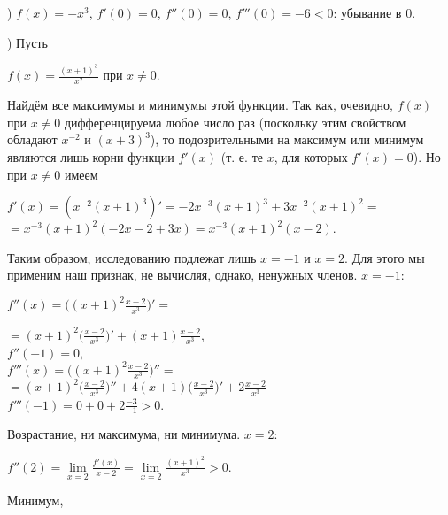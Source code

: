 \footnotesize
{}
\linespread{1}
\normalsize
{}) $f(x)=-x^3$, $f'(0)=0$, $f''(0)=0$, $f'''(0)=-6<0$: убывание в 0.
\par{}) Пусть
\begin{center}
$f(x)=\frac{(x+1)^3}{x^2}$ при $x\neq0$.
\end{center}
Найдём все максимумы и минимумы этой функции. Так как, очевидно, $f(x)$ при $x\neq0$ дифференцируема любое число раз (поскольку этим свойством обладают $x^{-2}$ и $(x+3)^3$), то подозрительными на максимум или минимум являются лишь корни функции $f'(x)$ (т. е. те $x$, для которых $f'(x)=0$). Но при $x\neq0$ имеем
\begin{center}
$f'(x)=(x^{-2}(x+1)^3)'=-2x^{-3}(x+1)^3+3x^{-2}(x+1)^2=$\\
$=x^{-3}(x+1)^2(-2x-2+3x)=x^{-3}(x+1)^2(x-2)$.
\end{center}
Таким образом, исследованию подлежат лишь $x=-1$ и $x=2$. Для этого мы применим наш признак, не вычисляя, однако, ненужных членов.
 $x=-1$:
\par\par$f''(x)=\Big((x+1)^2\frac{x-2}{x^3}\Big)'=$
\begin{center}
$=(x+1)^2\Big(\frac{x-2}{x^3}\Big)'+(x+1)\frac{x-2}{x^3}$,\\
$f''(-1)=0$,\\
$f'''(x)=\Big((x+1)^2\frac{x-2}{x^3}\Big)''=$\\
$=(x+1)^2\Big(\frac{x-2}{x^3}\Big)''+4(x+1)\Big(\frac{x-2}{x^3}\Big)'+2\frac{x-2}{x^3}$\\
$f'''(-1)=0+0+2\frac{-3}{-1}>0$.
\end{center}
Возрастание, ни максимума, ни минимума.
 $x=2$:
\begin{center}
$f''(2)=\lim\limits_{x= 2} \frac{f'(x)}{x-2}=\lim\limits_{x= 2} \frac{(x+1)^2}{x^3}>0$.
\end{center}
Минимум,